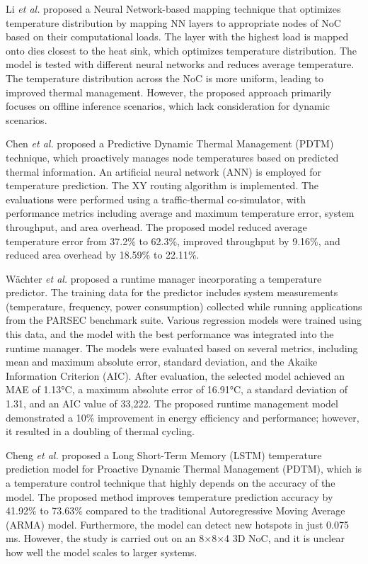 \documentclass[conference]{IEEEtran}
\begin{document}
Li \textit{et al.}\cite{9} proposed a Neural Network-based mapping technique that optimizes temperature distribution by mapping NN layers to appropriate nodes of NoC based on their computational loads. The layer with the highest load is mapped onto dies closest to the heat sink, which optimizes temperature distribution. The model is tested with different neural networks and reduces average temperature. The temperature distribution across the NoC is more uniform, leading to improved thermal management. However, the proposed approach primarily focuses on offline inference scenarios, which lack consideration for dynamic scenarios.

Chen \textit{et al.}\cite{10} proposed a Predictive Dynamic Thermal Management (PDTM) technique, which proactively manages node temperatures based on predicted thermal information. An artificial neural network (ANN) is employed for temperature prediction. The XY routing algorithm is implemented. The evaluations were performed using a traffic-thermal co-simulator, with performance metrics including average and maximum temperature error, system throughput, and area overhead. The proposed model reduced average temperature error from 37.2\% to 62.3\%, improved throughput by 9.16\%, and reduced area overhead by 18.59\% to 22.11\%.

Wächter \textit{et al.}\cite{11} proposed a runtime manager incorporating a temperature predictor. The training data for the predictor includes system measurements (temperature, frequency, power consumption) collected while running applications from the PARSEC benchmark suite. Various regression models were trained using this data, and the model with the best performance was integrated into the runtime manager. The models were evaluated based on several metrics, including mean and maximum absolute error, standard deviation, and the Akaike Information Criterion (AIC). After evaluation, the selected model achieved an MAE of 1.13°C, a maximum absolute error of 16.91°C, a standard deviation of 1.31, and an AIC value of 33,222. The proposed runtime management model demonstrated a 10\% improvement in energy efficiency and performance; however, it resulted in a doubling of thermal cycling.

Cheng \textit{et al.}\cite{12} proposed a Long Short-Term Memory (LSTM) temperature prediction model for Proactive Dynamic Thermal Management (PDTM), which is a temperature control technique that highly depends on the accuracy of the model. The proposed method improves temperature prediction accuracy by 41.92\% to 73.63\% compared to the traditional Autoregressive Moving Average (ARMA) model. Furthermore, the model can detect new hotspots in just 0.075 ms. However, the study is carried out on an 8×8×4 3D NoC, and it is unclear how well the model scales to larger systems.
\end{document}
